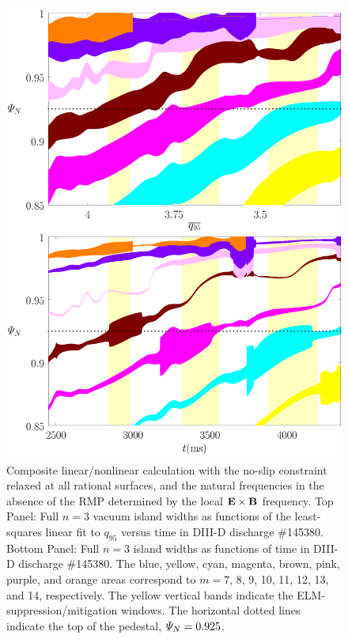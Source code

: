 \documentclass[12pt,prb,aps]{revtex4-1}
\begin{document}
\begin{figure}
\includegraphics[height=6in]{fig5.pdf}
\caption{Composite linear/nonlinear calculation with the no-slip constraint relaxed at all rational surfaces, and the natural frequencies
in the absence of the RMP determined by the local  ${\bf E}\times {\bf B}$
frequency. Top Panel: Full  $n=3$ vacuum island widths as functions of the least-squares linear fit to $q_{95}$ versus time 
in   DIII-D discharge \#145380.
Bottom Panel:  Full $n=3$ island widths as functions of time
in   DIII-D discharge \#145380. The blue, yellow, cyan, magenta, brown, pink,
purple, and orange  areas correspond to $m=7$, 8, 9, 10, 11, 12, 13, and 14, respectively. The yellow vertical bands indicate the ELM-suppression/mitigation windows. 
The horizontal dotted lines indicate the top of the pedestal, ${\mit\Psi}_N=0.925$.} \label{fig5}
\end{figure}
\end{document}
